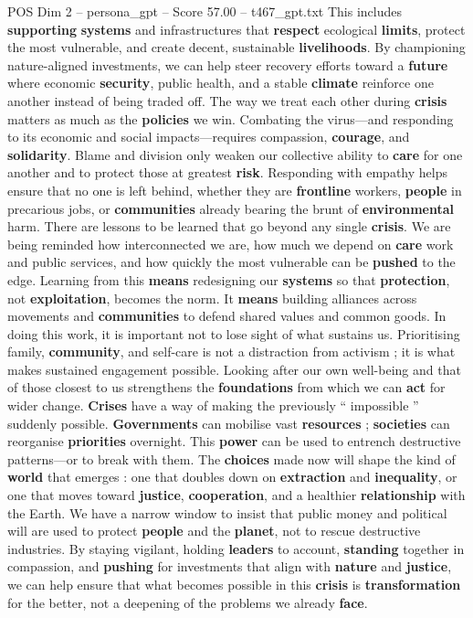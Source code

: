 \begin{textsample}{POS Dim 2 – persona\_gpt – Score 57.00 – t467\_gpt.txt}
This includes \textbf{supporting} \textbf{systems} and infrastructures that \textbf{respect} ecological \textbf{limits}, protect the most vulnerable, and create decent, sustainable \textbf{livelihoods}.
By championing nature-aligned investments, we can help steer recovery efforts toward a \textbf{future} where economic \textbf{security}, public health, and a stable \textbf{climate} reinforce one another instead of being traded off.
The way we treat each other during \textbf{crisis} matters as much as the \textbf{policies} we win.
Combating the virus—and responding to its economic and social impacts—requires compassion, \textbf{courage}, and \textbf{solidarity}.
Blame and division only weaken our collective ability to \textbf{care} for one another and to protect those at greatest \textbf{risk}.
Responding with empathy helps ensure that no one is left behind, whether they are \textbf{frontline} workers, \textbf{people} in precarious jobs, or \textbf{communities} already bearing the brunt of \textbf{environmental} harm.
There are lessons to be learned that go beyond any single \textbf{crisis}.
We are being reminded how interconnected we are, how much we depend on \textbf{care} work and public services, and how quickly the most vulnerable can be \textbf{pushed} to the edge.
Learning from this \textbf{means} redesigning our \textbf{systems} so that \textbf{protection}, not \textbf{exploitation}, becomes the norm.
It \textbf{means} building alliances across movements and \textbf{communities} to defend shared values and common goods.
In doing this work, it is important not to lose sight of what sustains us.
Prioritising family, \textbf{community}, and self-care is not a distraction from activism ; it is what makes sustained engagement possible.
Looking after our own well-being and that of those closest to us strengthens the \textbf{foundations} from which we can \textbf{act} for wider change. \textbf{Crises} have a way of making the previously “ impossible ” suddenly possible. \textbf{Governments} can mobilise vast \textbf{resources} ; \textbf{societies} can reorganise \textbf{priorities} overnight.
This \textbf{power} can be used to entrench destructive patterns—or to break with them.
The \textbf{choices} made now will shape the kind of \textbf{world} that emerges : one that doubles down on \textbf{extraction} and \textbf{inequality}, or one that moves toward \textbf{justice}, \textbf{cooperation}, and a healthier \textbf{relationship} with the Earth.
We have a narrow window to insist that public money and political will are used to protect \textbf{people} and the \textbf{planet}, not to rescue destructive industries.
By staying vigilant, holding \textbf{leaders} to account, \textbf{standing} together in compassion, and \textbf{pushing} for investments that align with \textbf{nature} and \textbf{justice}, we can help ensure that what becomes possible in this \textbf{crisis} is \textbf{transformation} for the better, not a deepening of the problems we already \textbf{face}.


\end{textsample}
